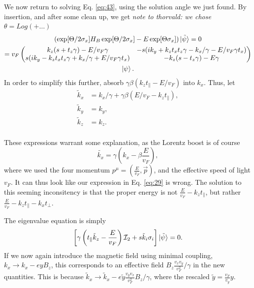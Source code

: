We now return to solving Eq. \eqref{eq:43}, using the solution angle we just found.
By insertion, and after some clean up, we get
\emph{note to thorvald: we chose \(\theta = Log \left(+ \dots\right) \)}
\begin{multline}
  \label{eq:52}
  (\exp[\Theta /2 \sigma_{x}] H_{B}\exp[\Theta /2 \sigma_{x}] - E \exp[\Theta \sigma_{x}]) \ket{\tilde{\psi}} = 0\\
  = v_F \begin{pmatrix}
          k_z ( s + t_z \gamma ) - E / v_F \gamma & -s ( ik_y + k_z t_x t_z \gamma - k_x / \gamma - E /v_{F} \gamma t_x)\\
          s ( i k_y - k_z t_x t_z \gamma + k_x / \gamma + E /v_F \gamma t_x) & - k_z (s - t_z \gamma) - E \gamma
        \end{pmatrix}\\
    \ket{\psi}.
\end{multline}
In order to simplify this further, absorb \(\gamma \beta (k_{z} t_{\parallel} - E /v_{F}) \) into \(k_{x}\).
Thus, let
\begin{equation}
  \label{eq:29}
  \begin{split}
    \tilde{k}_{x} &= k_{x} / \gamma + \gamma \beta ( E /v_F - k_{z} t_{\parallel}),\\
    \tilde{k}_{y} &=  k_{y},\\
    \tilde{k}_{z} &=  k_{z}.\\
  \end{split}
\end{equation}

These expressions warrant some explanation, as the Lorentz boost is of course
\begin{equation}
  \label{eq:23}
  \tilde{k_x} = \gamma (k_x - \beta \frac{E}{v_{F}}),
\end{equation}
where we used the four momentum \( p^{\mu } = (\frac{E}{v_{F}}, \vec{p}) \), and the effective speed of light \( v_F \).
It can thus look like our expression in Eq. \eqref{eq:29} is wrong.
The solution to this seeming inconsitency is that the proper energy is not \( \frac{E}{v_{F}} - k_z t_{\parallel} \), but rather \( \frac{E}{v_{F}} - k_z t_{\parallel} - k_x t_{\perp}\).

The eigenvalue equation is simply
\begin{equation}
  \label{eq:53}
  \left[  \gamma \left( t_{\parallel} \tilde{k}_{z} - \frac{E}{v_{F}} \right) \mathcal{I}_{2} +
  s \tilde{k}_{i} \sigma _{i} \right] \ket{\tilde{\psi}}= 0.
\end{equation}
If we now again introduce the magnetic field using minimal coupling, \(k_{x} \to  k_{x} - ey B_{z} \), this corresponds to an effective field \(B_{z} \frac{v_{x} v_{y}}{v_{F}^2} / \gamma \) in the new quantities.
This is because \(\tilde{k}_{x} \to  \tilde{k}_{x} - e \tilde{y} \frac{v_{y} v_{x}}{v_{F}^2}  B_{z} /\gamma \), where the rescaled \(\tilde{y} = \frac{v_{F}}{v_{y}} y\).


